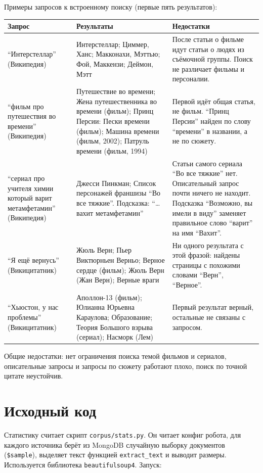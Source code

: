 \documentclass[12pt,a4paper,oneside,fleqn]{article}
\begin{document}
Примеры запросов к встроенному поиску (первые пять результатов):

\begin{longtable}{|p{4cm}|p{5.6cm}|p{5.4cm}|}
\hline
\textbf{Запрос} & \textbf{Результаты} & \textbf{Недостатки} \\
\hline
\enquote{Интерстеллар} (Википедия) & Интерстеллар; Циммер, Ханс; Макконахи, Мэттью; Фой, Маккензи; Деймон, Мэтт & После статьи о фильме идут статьи о людях из съёмочной группы. Поиск не различает фильмы и персоналии. \\
\hline
\enquote{фильм про путешествия во времени} (Википедия) & Путешествие во времени; Жена путешественника во времени (фильм); Принц Персии: Пески времени (фильм); Машина времени (фильм, 2002); Патруль времени (фильм, 1994) & Первой идёт общая статья, не фильм. \enquote{Принц Персии} найден по слову \enquote{времени} в названии, а не по сюжету. \\
\hline
\enquote{сериал про учителя химии который варит метамфетамин} (Википедия) & Джесси Пинкман; Список персонажей франшизы \enquote{Во все тяжкие}. Подсказка: \enquote{\ldots вахит метамфетамин} & Статьи самого сериала \enquote{Во все тяжкие} нет. Описательный запрос почти ничего не находит. Подсказка \enquote{Возможно, вы имели в виду} заменяет правильное слово \enquote{варит} на имя \enquote{Вахит}. \\
\hline
\enquote{Я ещё вернусь} (Викицитатник) & Жюль Верн; Пьер Виктюрньен Верньо; Верное сердце (фильм); Жюль Верн (Жан Верн); Верные враги & Ни одного результата с этой фразой: найдены страницы с похожими словами \enquote{Верн}, \enquote{Верное}. \\
\hline
\enquote{Хьюстон, у нас проблемы} (Викицитатник) & Аполлон-13 (фильм); Юлианна Юрьевна Караулова; Образование; Теория Большого взрыва (сериал); Насморк (Лем) & Первый результат верный, остальные не связаны с запросом. \\
\hline
\end{longtable}

Общие недостатки: нет ограничения поиска темой фильмов и сериалов, описательные запросы и запросы по сюжету работают плохо, поиск по точной цитате неустойчив.

\pagebreak

\section{Исходный код}

Статистику считает скрипт \texttt{corpus/stats.py}. Он читает конфиг робота, для каждого источника берёт из MongoDB случайную выборку документов (\texttt{\$sample}), выделяет текст функцией \texttt{extract\_text} и выводит размеры. Используется библиотека \texttt{beautifulsoup4}. Запуск:
\end{document}
